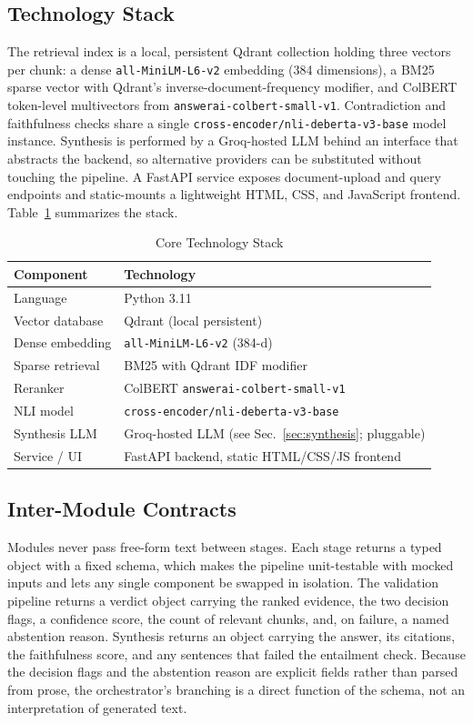 \documentclass[conference]{IEEEtran}
\begin{document}
\subsection{Technology Stack}
The retrieval index is a local, persistent Qdrant collection holding three
vectors per chunk: a dense \texttt{all-MiniLM-L6-v2} embedding (384
dimensions), a BM25 sparse vector with Qdrant's inverse-document-frequency
modifier, and ColBERT token-level multivectors from
\texttt{answerai-colbert-small-v1}. Contradiction and faithfulness checks
share a single \texttt{cross-encoder/nli-deberta-v3-base} model instance.
Synthesis is performed by a Groq-hosted LLM behind an interface
that abstracts the backend, so alternative providers can be substituted
without touching the pipeline. A FastAPI service exposes document-upload
and query endpoints and static-mounts a lightweight HTML, CSS, and
JavaScript frontend. Table~\ref{tab:stack} summarizes the stack.

\begin{table}[htbp]
\caption{Core Technology Stack}
\label{tab:stack}
\centering
\small
\begin{tabularx}{\columnwidth}{@{}l X@{}}
\toprule
Component & Technology \\
\midrule
Language          & Python 3.11 \\
Vector database   & Qdrant (local persistent) \\
Dense embedding   & \texttt{all-MiniLM-L6-v2} (384-d) \\
Sparse retrieval  & BM25 with Qdrant IDF modifier \\
Reranker          & ColBERT \texttt{answerai-colbert-small-v1} \\
NLI model         & \texttt{cross-encoder/nli-deberta-v3-base} \\
Synthesis LLM     & Groq-hosted LLM (see Sec.~\ref{sec:synthesis}; pluggable) \\
Service / UI      & FastAPI backend, static HTML/CSS/JS frontend \\
\bottomrule
\end{tabularx}
\end{table}

\subsection{Inter-Module Contracts}
Modules never pass free-form text between stages. Each stage returns a
typed object with a fixed schema, which makes the pipeline unit-testable
with mocked inputs and lets any single component be swapped in isolation.
The validation pipeline returns a verdict object carrying the ranked
evidence, the two decision flags, a confidence score, the count of
relevant chunks, and, on failure, a named abstention reason. Synthesis
returns an object carrying the answer, its citations, the faithfulness
score, and any sentences that failed the entailment check. Because the
decision flags and the abstention reason are explicit fields rather than
parsed from prose, the orchestrator's branching is a direct function of the
schema, not an interpretation of generated text.
\end{document}
